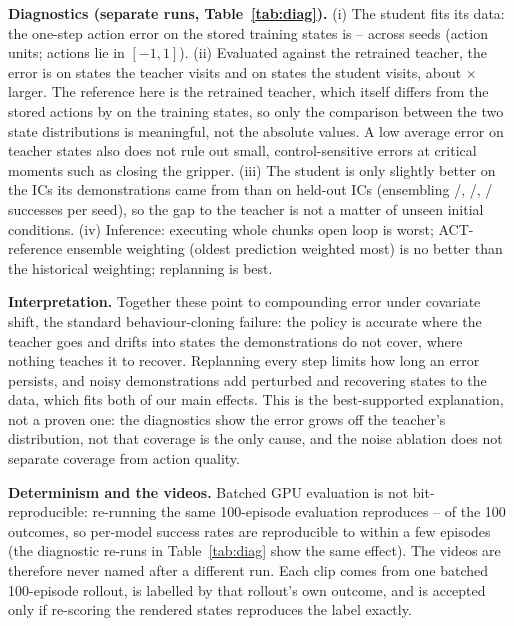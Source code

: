 \documentclass[11pt]{article}
\begin{document}
\textbf{Diagnostics (separate runs, Table~\ref{tab:diag}).} (i) The student
fits its data: the one-step action error on the stored training states is
\diagMaeTrainZero--\diagMaeTrainTwo{} across seeds (action units; actions lie in
$[-1,1]$). (ii) Evaluated against the retrained teacher, the error is
\diagMaeTeacherZero{} on states the teacher visits and \diagMaeStudentZero{} on
states the student visits, about \diagMaeRatioZero$\times$ larger. The reference
here is the retrained teacher, which itself differs from the stored actions by
\diagTeacherFloor{} on the training states, so only the comparison between the
two state distributions is meaningful, not the absolute values. A low average
error on teacher states also does not rule out small, control-sensitive errors
at critical moments such as closing the gripper. (iii) The student is only
slightly better on the ICs its demonstrations came from than on held-out ICs
(ensembling \diagTrainEnsZero/\diagTestEnsZero,
\diagTrainEnsOne/\diagTestEnsOne, \diagTrainEnsTwo/\diagTestEnsTwo{} successes per
seed), so the gap to the teacher is not a matter of unseen initial
conditions. (iv) Inference: executing whole chunks open loop is worst;
ACT-reference ensemble weighting (oldest prediction weighted most) is no better
than the historical weighting; replanning is best.



\textbf{Interpretation.} Together these point to compounding error under
covariate shift, the standard behaviour-cloning failure: the policy is accurate
where the teacher goes and drifts into states the demonstrations do not cover,
where nothing teaches it to recover. Replanning every step limits how long an
error persists, and noisy demonstrations add perturbed and recovering states to
the data, which fits both of our main effects. This is the best-supported
explanation, not a proven one: the diagnostics show the error grows off the
teacher's distribution, not that coverage is the only cause, and the noise
ablation does not separate coverage from action quality.

\textbf{Determinism and the videos.} Batched GPU evaluation is not
bit-reproducible: re-running the same 100-episode evaluation reproduces
\videoAgreeMin--\videoAgreeMax{} of the 100 outcomes, so per-model success rates
are reproducible to within a few episodes (the diagnostic re-runs in
Table~\ref{tab:diag} show the same effect). The videos are therefore never named
after a different run. Each clip comes from one batched 100-episode rollout,
is labelled by that rollout's own outcome, and is accepted only if re-scoring
the rendered states reproduces the label exactly.
\end{document}
